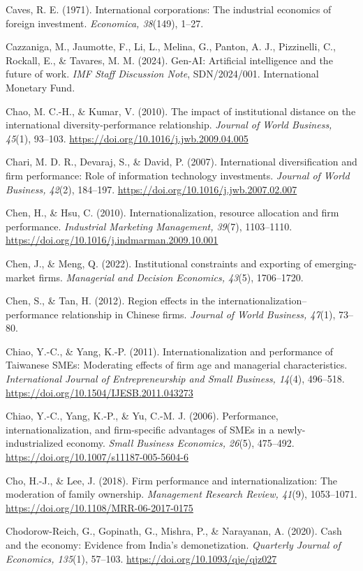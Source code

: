 \documentclass[
  a4paper,
  13pt]{extreport}
\begin{document}
Caves, R. E. (1971). International corporations: The industrial
economics of foreign investment. \emph{Economica, 38}(149), 1--27.

Cazzaniga, M., Jaumotte, F., Li, L., Melina, G., Panton, A. J.,
Pizzinelli, C., Rockall, E., \& Tavares, M. M. (2024). Gen-AI:
Artificial intelligence and the future of work. \emph{IMF Staff
Discussion Note}, SDN/2024/001. International Monetary Fund.

Chao, M. C.-H., \& Kumar, V. (2010). The impact of institutional
distance on the international diversity-performance relationship.
\emph{Journal of World Business, 45}(1), 93--103.
\url{https://doi.org/10.1016/j.jwb.2009.04.005}

Chari, M. D. R., Devaraj, S., \& David, P. (2007). International
diversification and firm performance: Role of information technology
investments. \emph{Journal of World Business, 42}(2), 184--197.
\url{https://doi.org/10.1016/j.jwb.2007.02.007}

Chen, H., \& Hsu, C. (2010). Internationalization, resource allocation
and firm performance. \emph{Industrial Marketing Management, 39}(7),
1103--1110. \url{https://doi.org/10.1016/j.indmarman.2009.10.001}

Chen, J., \& Meng, Q. (2022). Institutional constraints and exporting of
emerging-market firms. \emph{Managerial and Decision Economics, 43}(5),
1706--1720.

Chen, S., \& Tan, H. (2012). Region effects in the
internationalization--performance relationship in Chinese firms.
\emph{Journal of World Business, 47}(1), 73--80.

Chiao, Y.-C., \& Yang, K.-P. (2011). Internationalization and
performance of Taiwanese SMEs: Moderating effects of firm age and
managerial characteristics. \emph{International Journal of
Entrepreneurship and Small Business, 14}(4), 496--518.
\url{https://doi.org/10.1504/IJESB.2011.043273}

Chiao, Y.-C., Yang, K.-P., \& Yu, C.-M. J. (2006). Performance,
internationalization, and firm-specific advantages of SMEs in a
newly-industrialized economy. \emph{Small Business Economics, 26}(5),
475--492. \url{https://doi.org/10.1007/s11187-005-5604-6}

Cho, H.-J., \& Lee, J. (2018). Firm performance and
internationalization: The moderation of family ownership.
\emph{Management Research Review, 41}(9), 1053--1071.
\url{https://doi.org/10.1108/MRR-06-2017-0175}

Chodorow-Reich, G., Gopinath, G., Mishra, P., \& Narayanan, A. (2020).
Cash and the economy: Evidence from India's demonetization.
\emph{Quarterly Journal of Economics, 135}(1), 57--103.
\url{https://doi.org/10.1093/qje/qjz027}
\end{document}
